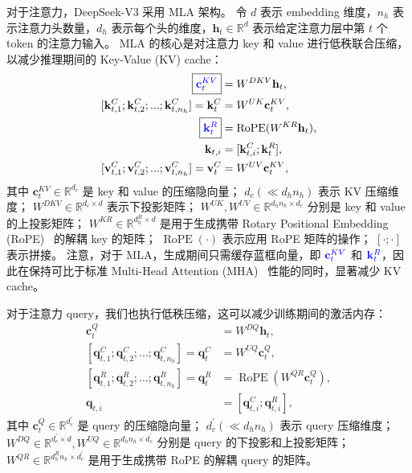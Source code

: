 \documentclass[11pt, a4paper, logo, copyright, nonumbering]{deepseek}
\newcommand{\dsattn}{MLA}
\newcommand{\dsviii}{DeepSeek-V3}
\begin{document}
对于注意力，\dsviii{} 采用 \dsattn{} 架构。
令 $d$ 表示 embedding 维度，$n_h$ 表示注意力头数量，$d_h$ 表示每个头的维度，$\mathbf{h}_{t} \in \mathbb{R}^{d}$ 表示给定注意力层中第 $t$ 个 token 的注意力输入。
\dsattn{} 的核心是对注意力 key 和 value 进行低秩联合压缩，以减少推理期间的 Key-Value (KV) cache：
\begin{align}
    \boxed{\color{blue} \mathbf{c}_{t}^{KV}} &= W^{DKV} \mathbf{h}_{t}, \\
    [\mathbf{k}_{t, 1}^{C};\mathbf{k}_{t, 2}^{C};...;\mathbf{k}_{t, n_{h}}^{C}] = \mathbf{k}_{t}^{C} &= W^{UK} \mathbf{c}_{t}^{KV}, \\
    \boxed{\color{blue}\mathbf{k}_{t}^{R}} &= \operatorname{RoPE}({W^{KR}} \mathbf{h}_{t}), \\
    \mathbf{k}_{t, i} &= [\mathbf{k}_{t, i}^{C}; \mathbf{k}_{t}^{R}], \\
    [\mathbf{v}_{t, 1}^{C};\mathbf{v}_{t, 2}^{C};...;\mathbf{v}_{t, n_{h}}^{C}] = \mathbf{v}_{t}^{C} &= W^{UV} \mathbf{c}_{t}^{KV}, 
\end{align}
其中 $\mathbf{c}_{t}^{KV} \in \mathbb{R}^{d_c}$ 是 key 和 value 的压缩隐向量；
$d_c (\ll d_h n_h)$ 表示 KV 压缩维度；
$W^{DKV} \in \mathbb{R}^{d_c \times d}$ 表示下投影矩阵；
$W^{UK},W^{UV} \in \mathbb{R}^{d_h n_h \times d_c}$ 分别是 key 和 value 的上投影矩阵；
$W^{KR} \in \mathbb{R}^{d_h^R \times d}$ 是用于生成携带 Rotary Positional Embedding (RoPE)~\citep{su2024roformer} 的解耦 key 的矩阵；
$\operatorname{RoPE}(\cdot)$ 表示应用 RoPE 矩阵的操作；
$[\cdot;\cdot]$ 表示拼接。
注意，对于 MLA，生成期间只需缓存蓝框向量，即 $\color{blue} \mathbf{c}_{t}^{KV}$ 和 $\color{blue}\mathbf{k}_{t}^{R}$，因此在保持可比于标准 Multi-Head Attention (MHA)~\citep{transformer} 性能的同时，显著减少 KV cache。

对于注意力 query，我们也执行低秩压缩，这可以减少训练期间的激活内存：
\begin{align}
    \mathbf{c}_{t}^{Q} &= W^{DQ} \mathbf{h}_{t}, \\
    [\mathbf{q}_{t, 1}^{C};\mathbf{q}_{t, 2}^{C};...;\mathbf{q}_{t, n_{h}}^{C}] = \mathbf{q}_{t}^{C} &= W^{UQ} \mathbf{c}_{t}^{Q}, \\
    [\mathbf{q}_{t, 1}^{R};\mathbf{q}_{t, 2}^{R};...;\mathbf{q}_{t, n_{h}}^{R}] = \mathbf{q}_{t}^{R} &= \operatorname{RoPE}({W^{QR}} \mathbf{c}_{t}^{Q}), \\
    \mathbf{q}_{t, i} &= [\mathbf{q}_{t, i}^{C}; \mathbf{q}_{t, i}^{R}],
\end{align}
其中 $\mathbf{c}_{t}^{Q} \in \mathbb{R}^{d_c^{\prime}}$ 是 query 的压缩隐向量；
$d_c^{\prime} (\ll d_h n_h)$ 表示 query 压缩维度；
$W^{DQ} \in \mathbb{R}^{d_c^{\prime} \times d}, W^{UQ} \in \mathbb{R}^{d_h n_h \times d_c^{\prime}}$ 分别是 query 的下投影和上投影矩阵；
$W^{QR} \in \mathbb{R}^{d_h^R n_h \times d_c^{\prime}}$ 是用于生成携带 RoPE 的解耦 query 的矩阵。
\end{document}
